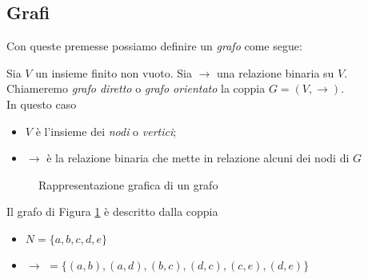 \subsection{Grafi}
Con queste premesse possiamo definire un \emph{grafo} come segue:
\begin{definition}
    Sia $V$ un insieme finito non vuoto. Sia $\to$ una relazione binaria su $V$.\\
    Chiameremo \emph{grafo diretto} o \emph{grafo orientato} la coppia $G = (V, \to)$.\\
    In questo caso
    \begin{itemize}
        \item $V$ è l'insieme dei \emph{nodi} o \emph{vertici};
        \item $\to$ è la relazione binaria che mette in relazione alcuni dei nodi di $G$
    \end{itemize}
\end{definition}
\begin{example}
    \begin{figure}[b]
        \centering
        \caption{Rappresentazione grafica di un grafo}
        \label{fig:graph}
    \end{figure}
    Il grafo di Figura \ref*{fig:graph} è descritto dalla coppia
    \begin{itemize}
        \item $N = \{a,b,c,d,e\}$
        \item $\to \,\,= \{(a,b), (a,d), (b,c), (d,c), (c,e), (d,e)\}$
    \end{itemize}
\end{example}
